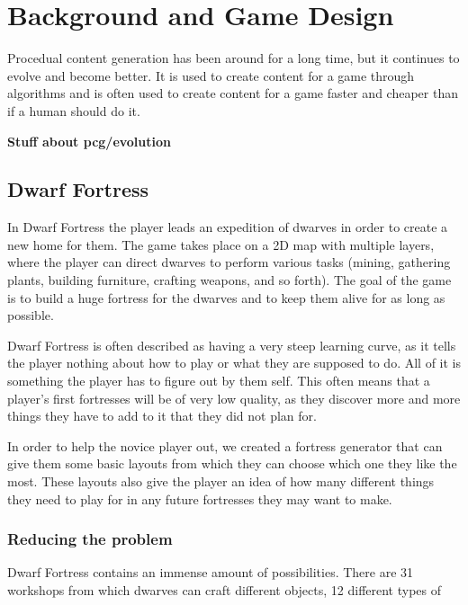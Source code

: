 \section{Background and Game Design}
\label{02}

Procedual content generation has been around for a long time, but it continues to evolve and become better. It is used to create content for a game through algorithms and is often used to create content for a game faster and cheaper than if a human should do it.

\textbf{Stuff about pcg/evolution}

\subsection{Dwarf Fortress}
\label{02_DF}

In Dwarf Fortress the player leads an expedition of dwarves in order to create a new home for them. The game takes place on a 2D map with multiple layers, where the player can direct dwarves to perform various tasks (mining, gathering plants, building furniture, crafting weapons, and so forth). The goal of the game is to build a huge fortress for the dwarves and to keep them alive for as long as possible.

Dwarf Fortress is often described as having a very steep learning curve, as it tells the player nothing about how to play or what they are supposed to do. All of it is something the player has to figure out by them self. This often means that a player's first fortresses will be of very low quality, as they discover more and more things they have to add to it that they did not plan for.


In order to help the novice player out, we created a fortress generator that can give them some basic layouts from which they can choose which one they like the most. These layouts also give the player an idea of how many different things they need to play for in any future fortresses they may want to make.

\subsubsection{Reducing the problem}
\label{02_DF_Reducing}

Dwarf Fortress contains an immense amount of possibilities. There are 31 workshops from which dwarves can craft different objects, 12 different types of rooms each with their own function and 16 different stockpiles which are used for storing specific types of items. These are all connected in different ways and even with just the mentioned things, it is already overwhelming for any new player. That is without mentioning special types of constructions, mechanics and the militaristic area of the game.

